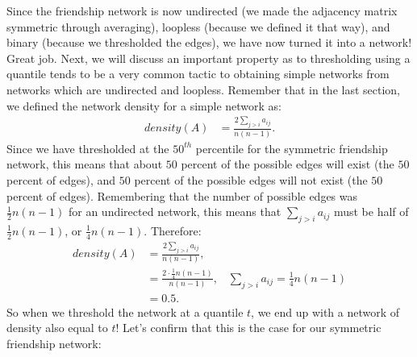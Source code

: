 \documentclass[letterpaper,10pt,english]{jupyterBook}
\begin{document}
\sphinxAtStartPar
Since the friendship network is now undirected (we made the adjacency matrix symmetric through averaging), loopless (because we defined it that way), and binary (because we thresholded the edges), we have now turned it into a  network! Great job. Next, we will discuss an important property as to  thresholding using a quantile tends to be a very common tactic to obtaining simple networks from networks which are undirected and loopless. Remember that in the last section, we defined the network density for a simple network as:
\begin{align*}
    density(A) &= \frac{2\sum_{j > i}a_{ij}}{n(n - 1)}.
\end{align*}
\sphinxAtStartPar
Since we have thresholded at the \(50^{th}\) percentile for the symmetric friendship network, this means that about \(50\) percent of the possible edges will exist (the  \(50\) percent of edges), and \(50\) percent of the possible edges will not exist (the  \(50\) percent of edges). Remembering that the number of possible edges was \(\frac{1}{2}n(n - 1)\) for an undirected network, this means that \(\sum_{j > i}a_{ij}\) must be half of \(\frac{1}{2}n(n - 1)\), or \(\frac{1}{4}n(n - 1)\). Therefore:
\begin{align*}
    density(A) &= \frac{2\sum_{j > i}a_{ij}}{n(n - 1)}, \\
    &= \frac{2\cdot \frac{1}{4}n(n - 1)}{n(n - 1)},\;\;\;\sum_{j > i}a_{ij} = \frac{1}{4}n(n - 1) \\
    &= 0.5.
\end{align*}
\sphinxAtStartPar
So when we threshold the network at a quantile \(t\), we end up with a network of density also equal to \(t\)! Let’s confirm that this is the case for our symmetric friendship network:
\end{document}
